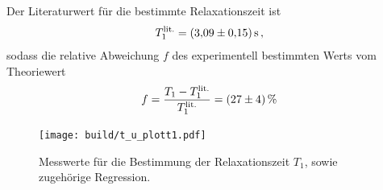 Der Literaturwert\cite{litwerte} für die bestimmte Relaxationszeit ist
\begin{align*}
  T_{1}^\text{lit.} = \SI{3.09+-0.15}{\second} \, ,
\end{align*}
sodass die relative Abweichung $f$ des experimentell bestimmten Werts
vom Theoriewert
\begin{align*}
  f = \frac{T_{1} - T_{1}^\text{lit.}}{T_{1}^\text{lit.}} = \SI{27+-4}{\percent}
\end{align*}


\begin{figure}[hhh]
  \centering
  \texttt{[image: build/t\_u\_plott1.pdf]}
  \caption{Messwerte für die Bestimmung der Relaxationszeit $T_{1}$, sowie zugehörige Regression.}
  \label{fig:meiboomgill}
\end{figure}


